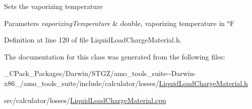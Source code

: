Sets the vaporizing temperature 
\begin{DoxyParams}{Parameters}
{\em vaporizing\+Temperature} & double, vaporizing temperature in °F \\
\hline
\end{DoxyParams}


Definition at line 120 of file Liquid\+Load\+Charge\+Material.\+h.



The documentation for this class was generated from the following files\+:\begin{DoxyCompactItemize}
\item 
\+\_\+\+C\+Pack\+\_\+\+Packages/\+Darwin/\+S\+T\+G\+Z/amo\+\_\+tools\+\_\+suite-\/-\/\+Darwin-\/x86\+\_/amo\+\_\+tools\+\_\+suite/include/calculator/losses/\hyperlink{___c_pack___packages_2_darwin_2_s_t_g_z_2amo__tools__suite--_darwin-x86__64_2amo__tools__suite_22c7eb4395ab7cdaebdd8c8124e88f284}{Liquid\+Load\+Charge\+Material.\+h}\item 
src/calculator/losses/\hyperlink{_liquid_load_charge_material_8cpp}{Liquid\+Load\+Charge\+Material.\+cpp}\end{DoxyCompactItemize}

